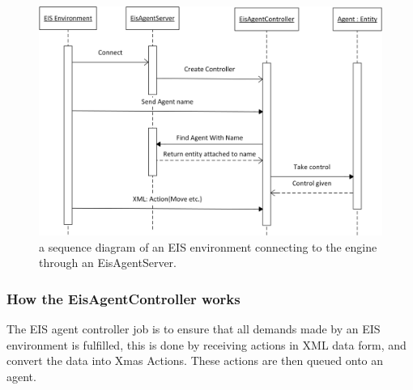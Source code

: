 \begin{figure}
\begin{centering}
\includegraphics[width=1\textwidth]{EISServerSequenceDiagram}
\par\end{centering}

\caption{a sequence diagram of an EIS environment connecting to the engine
through an EisAgentServer.\label{fig:EISServerSequenceDiagram}}


\end{figure}



\subsubsection*{How the EisAgentController works}

The EIS agent controller job is to ensure that all demands made by
an EIS environment is fulfilled, this is done by receiving actions
in XML data form, and convert the data into Xmas Actions. These actions
are then queued onto an agent.

